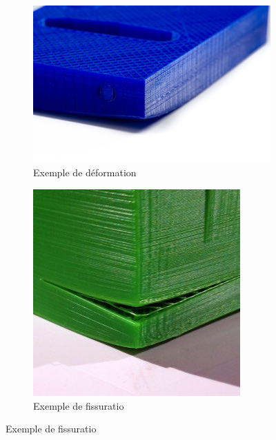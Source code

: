 \documentclass[11pt,a4paper]{article}
\begin{document}
\begin{figure}[H]
    \centering
    \begin{subfigure}[b]{0.4\textwidth}
        \includegraphics[width=\textwidth,cfbox=azul_marcos 4pt 0pt]{FOTOS/EJEMPLO_WARPING}
	\caption*{Exemple de déformation}
    \end{subfigure}
    \qquad %
    \begin{subfigure}[b]{0.4\textwidth}
        \includegraphics[width=\textwidth,cfbox=azul_marcos 4pt 0pt]{FOTOS/EJEMPLO_CRACKING}
	\caption*{Exemple de fissuratio}
    \end{subfigure}   
\end{figure}
\end{document}

